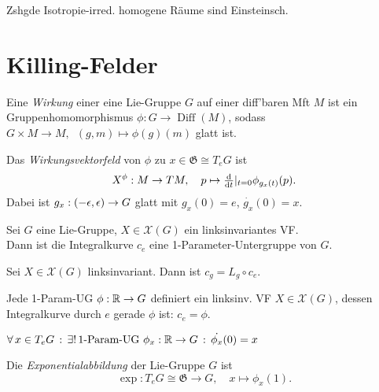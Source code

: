 \documentclass{cheat-sheet}
\newcommand{\vinterval}{\ointerval{-\epsilon}{\epsilon}} %
\DeclareMathOperator{\Diff}{Diff}
\newcommand{\Gie}{\mathfrak{G}} %
\newcommand{\VF}{\mathcal{X}} %
\begin{document}
\begin{satz}
  Zshgde Isotropie-irred. homogene Räume sind Einsteinsch.
\end{satz}


\section{Killing-Felder}

\begin{defn}
  Eine \emph{Wirkung} einer eine Lie-Gruppe $G$ auf einer diff'baren Mft $M$ ist ein Gruppenhomomorphismus $\phi : G \to \Diff(M)$, sodass $G \times M \to M, \enspace (g, m) \mapsto \phi(g)(m)$ glatt ist.
\end{defn}

\begin{defn}
  Das \emph{Wirkungsvektorfeld} von $\phi$ zu $x \in \Gie \cong T_e G$ ist
  \[
    X^\phi : M \to TM, \quad
    p \mapsto \tfrac{\mathrm{d}}{\mathrm{d} t}|_{t=0} \phi_{g_x(t)}(p).
  \]
  Dabei ist $g_x : \vinterval \to G$ glatt mit $g_x(0) = e$, $\dot{g_x}(0) = x$.
\end{defn}


\begin{lem}
  Sei $G$ eine Lie-Gruppe, $X \in \VF(G)$ ein linksinvariantes VF. \\
  Dann ist die Integralkurve $c_e$ eine 1-Parameter-Untergruppe von $G$.
\end{lem}

\begin{lem}
  Sei $X \in \VF(G)$ linksinvariant. Dann ist $c_g = L_g \circ c_e$.
\end{lem}

\begin{lem}
  Jede 1-Param-UG $\phi : \mathbb{R} \to G$ definiert ein linksinv. VF $X \in \VF(G)$, dessen Integralkurve durch $e$ gerade $\phi$ ist: $c_e = \phi$.
\end{lem}

\begin{fazit}
  $\forall \, {x \in T_e G} \,:\, \exists! \, {\text{1-Param-UG } \phi_x : \mathbb{R} \to G} \,:\, \dot{\phi_x}(0) = x$
\end{fazit}

\begin{defn}
  Die \emph{Exponentialabbildung} der Lie-Gruppe $G$ ist
  \[
    \exp : T_e G \cong \Gie \to G, \quad
    x \mapsto \phi_x(1).
  \]
\end{defn}
\end{document}
